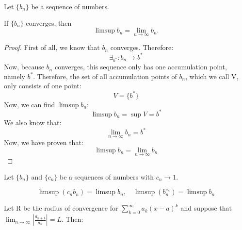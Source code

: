 \documentclass[week=11]{homework}
\date{\today}
\begin{document}
    \maketitle
    \thispagestyle{empty}
    \newpage
    \begin{questions}
		\let\firstquestion\question
		\renewcommand*{\question}{\vspace{7mm}\firstquestion}
        \firstquestion
		Let $\{b_n \}$ be a sequence of numbers. 
		\begin{inlinetoprove}
			If $\{b_n \}$ converges, then 
			\[
				\limsup b_n = \lim_{n \to \infty} b_n.
			\]
		\end{inlinetoprove}
		\begin{proof}
			First of all, we know that $b_n$ converges. Therefore:
			\[
				\exists_{b^*}: b_n \to b^*
			\]
			Now, because $b_n$ converges, this sequence only has one accumulation point, namely $b^*$. Therefore, the set of all accumulation points of $b_n$, which we call V, only consists of one point: 
			\[
				V = \{b^*\}
			\]
			Now, we can find $\limsup b_n$:
			\[
				\limsup b_n = \sup V = b^*
			\]
			We also know that:
			\[
				\lim_{n \to \infty} b_n = b^*
			\]
			Now, we have proven that:
			\[
				\limsup b_n = \lim_{n \to \infty} b_n
			\]
		\end{proof}
		\question
		Let $\{b_n \}$ and $\{c_n \}$ be a sequences of numbers with $c_n \to 1$. 
		\begin{inlinetoprove}
			\[
				\limsup (c_n b_n) = \limsup b_n, \quad \limsup (b_n^{c_n}) = \limsup b_n
			\]
		\end{inlinetoprove}
		
		\question
		Let R be the radius of convergence for $\sum_{k=0}^{\infty} a_k (x - a)^k$ and suppose that $\lim_{n \to \infty} \left| \frac{a_{n+1}}{a_n} \right| = L$. Then:
		

\end{questions}
\end{document}

